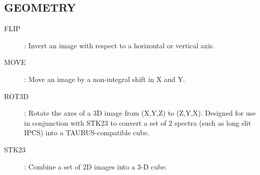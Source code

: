 \subsection {GEOMETRY}
\begin{description}
\begin{description}
\item [FLIP]: Invert an image with respect to a horizontal or vertical axis.
\item [MOVE]: Move an image by a non-integral shift in X and Y.
\item [ROT3D]: Rotate the axes of a 3D image from (X,Y,Z) to (Z,Y,X).
Designed for use in conjunction with STK23 to convert a set of 2 spectra (such
as long slit IPCS) into a TAURUS-compatible cube.
\item [STK23]: Combine a set of 2D images into a 3-D cube.
\end{description}
\end{description}
